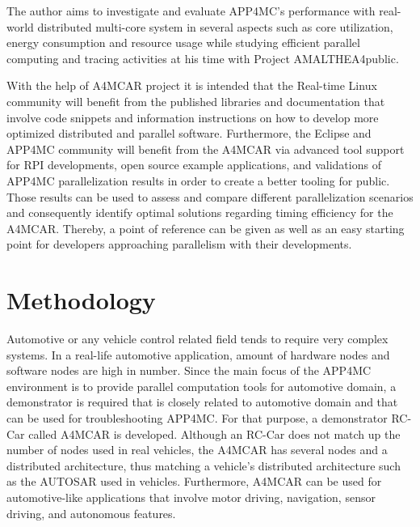 The author aims to investigate and evaluate APP4MC's performance with real-world distributed multi-core system in several aspects such as core utilization, energy consumption and resource usage while studying efficient parallel computing and tracing activities at his time with Project AMALTHEA4public.

With the help of A4MCAR project it is intended that the Real-time Linux community will benefit from the published libraries and documentation that involve code snippets and information instructions on how to develop more optimized distributed and parallel software. Furthermore, the Eclipse and APP4MC community will benefit from the A4MCAR via advanced tool support for RPI developments, open source example applications, and validations of APP4MC parallelization results in order to create a better tooling for public. Those results can be used to assess and compare different parallelization scenarios and consequently identify optimal solutions regarding timing efficiency for the A4MCAR. Thereby, a point of reference can be given as well as an easy starting point for developers approaching parallelism with their developments. 

\section{Methodology}

Automotive or any vehicle control related field tends to require very complex systems. In a real-life automotive application, amount of hardware nodes and software nodes are high in number. Since the main focus of the APP4MC environment is to provide parallel computation tools for automotive domain, a demonstrator is required that is closely related to automotive domain and that can be used for troubleshooting APP4MC. For that purpose, a demonstrator RC-Car called A4MCAR is developed. Although an RC-Car does not match up the number of nodes used in real vehicles, the A4MCAR has several nodes and a distributed architecture, thus matching a vehicle's distributed architecture such as the AUTOSAR used in vehicles. Furthermore, A4MCAR can be used for automotive-like applications that involve motor driving, navigation, sensor driving, and autonomous features.

